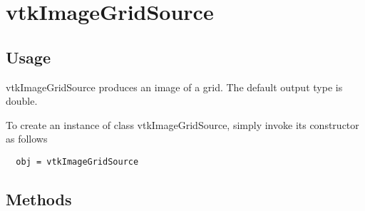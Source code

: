 \section{vtkImageGridSource}

\subsection{Usage}

 vtkImageGridSource produces an image of a grid.  The
 default output type is double.

To create an instance of class vtkImageGridSource, simply
invoke its constructor as follows
\begin{verbatim}
  obj = vtkImageGridSource
\end{verbatim}
\subsection{Methods}

